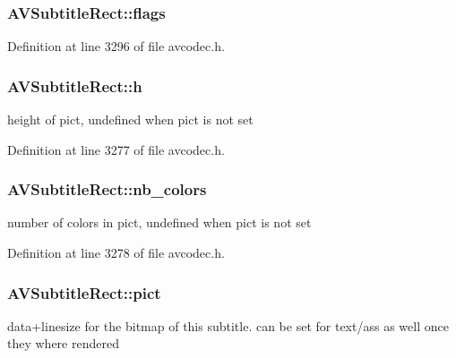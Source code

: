 \subsubsection[{\texorpdfstring{flags}{flags}}]{ A\+V\+Subtitle\+Rect\+::flags}\hypertarget{struct_a_v_subtitle_rect_a1eb6a2cfe6a14c7405f45fd83d76b8db}{}\label{struct_a_v_subtitle_rect_a1eb6a2cfe6a14c7405f45fd83d76b8db}


Definition at line 3296 of file avcodec.\+h.

\subsubsection[{\texorpdfstring{h}{h}}]{ A\+V\+Subtitle\+Rect\+::h}\hypertarget{struct_a_v_subtitle_rect_afb3272792cfe659e9e788074d3328d3d}{}\label{struct_a_v_subtitle_rect_afb3272792cfe659e9e788074d3328d3d}


height of pict, undefined when pict is not set 



Definition at line 3277 of file avcodec.\+h.

\subsubsection[{\texorpdfstring{nb\+\_\+colors}{nb_colors}}]{ A\+V\+Subtitle\+Rect\+::nb\+\_\+colors}\hypertarget{struct_a_v_subtitle_rect_a7d5855be665def02c2d981a6ac1b7579}{}\label{struct_a_v_subtitle_rect_a7d5855be665def02c2d981a6ac1b7579}


number of colors in pict, undefined when pict is not set 



Definition at line 3278 of file avcodec.\+h.

\subsubsection[{\texorpdfstring{pict}{pict}}]{ A\+V\+Subtitle\+Rect\+::pict}\hypertarget{struct_a_v_subtitle_rect_a14d5940b24016a2c0afcaea2642fc692}{}\label{struct_a_v_subtitle_rect_a14d5940b24016a2c0afcaea2642fc692}
data+linesize for the bitmap of this subtitle. can be set for text/ass as well once they where rendered 

